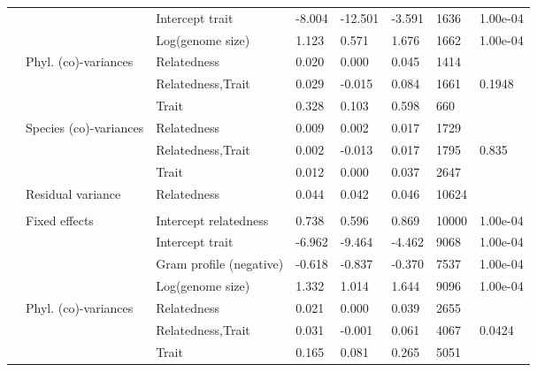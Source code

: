 \begin{longtable}[t]{llllllll}
\hspace{1em} &  & Intercept trait & -8.004 & -12.501 & -3.591 & 1636 & 1.00e-04\\
\hspace{1em} &  & Log(genome size) & 1.123 & 0.571 & 1.676 & 1662 & 1.00e-04\\
\hspace{1em} & Phyl. (co)-variances & Relatedness & 0.020 & 0.000 & 0.045 & 1414 & \\
\hspace{1em} &  & Relatedness,Trait & 0.029 & -0.015 & 0.084 & 1661 & 0.1948\\
\hspace{1em} &  & Trait & 0.328 & 0.103 & 0.598 & 660 & \\
\hspace{1em} & Species (co)-variances & Relatedness & 0.009 & 0.002 & 0.017 & 1729 & \\
\hspace{1em} &  & Relatedness,Trait & 0.002 & -0.013 & 0.017 & 1795 & 0.835\\
\hspace{1em} &  & Trait & 0.012 & 0.000 & 0.037 & 2647 & \\
\hspace{1em} & Residual variance & Relatedness & 0.044 & 0.042 & 0.046 & 10624 & \\
\addlinespace[0.3em]
\multicolumn{8}{l}{\textbf{Secretome}}\\
\hspace{1em} & Fixed effects & Intercept relatedness & 0.738 & 0.596 & 0.869 & 10000 & 1.00e-04\\
\hspace{1em} &  & Intercept trait & -6.962 & -9.464 & -4.462 & 9068 & 1.00e-04\\
\hspace{1em} &  & Gram profile (negative) & -0.618 & -0.837 & -0.370 & 7537 & 1.00e-04\\
\hspace{1em} &  & Log(genome size) & 1.332 & 1.014 & 1.644 & 9096 & 1.00e-04\\
\hspace{1em} & Phyl. (co)-variances & Relatedness & 0.021 & 0.000 & 0.039 & 2655 & \\
\hspace{1em} &  & Relatedness,Trait & 0.031 & -0.001 & 0.061 & 4067 & 0.0424\\
\hspace{1em} &  & Trait & 0.165 & 0.081 & 0.265 & 5051 & \\

\end{longtable}
